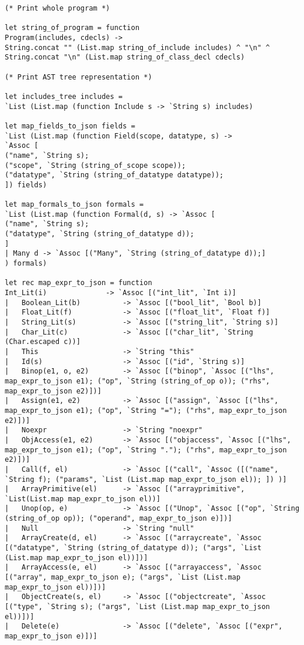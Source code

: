 \begin{verbatim}
(* Print whole program *)

let string_of_program = function
Program(includes, cdecls) -> 
String.concat "" (List.map string_of_include includes) ^ "\n" ^
String.concat "\n" (List.map string_of_class_decl cdecls)

(* Print AST tree representation *)

let includes_tree includes = 
`List (List.map (function Include s -> `String s) includes)

let map_fields_to_json fields = 
`List (List.map (function Field(scope, datatype, s) -> 
`Assoc [
("name", `String s);
("scope", `String (string_of_scope scope));
("datatype", `String (string_of_datatype datatype));
]) fields)

let map_formals_to_json formals = 
`List (List.map (function Formal(d, s) -> `Assoc [
("name", `String s);
("datatype", `String (string_of_datatype d));
]
| Many d -> `Assoc [("Many", `String (string_of_datatype d));]
) formals)

let rec map_expr_to_json = function 
Int_Lit(i)				-> `Assoc [("int_lit", `Int i)]
|	Boolean_Lit(b)			-> `Assoc [("bool_lit", `Bool b)]
|	Float_Lit(f)			-> `Assoc [("float_lit", `Float f)]
|	String_Lit(s)			-> `Assoc [("string_lit", `String s)]
|	Char_Lit(c)				-> `Assoc [("char_lit", `String (Char.escaped c))]
|	This					-> `String "this"
|	Id(s)					-> `Assoc [("id", `String s)]
|	Binop(e1, o, e2)		-> `Assoc [("binop", `Assoc [("lhs", map_expr_to_json e1); ("op", `String (string_of_op o)); ("rhs", map_expr_to_json e2)])]
|	Assign(e1, e2)			-> `Assoc [("assign", `Assoc [("lhs", map_expr_to_json e1); ("op", `String "="); ("rhs", map_expr_to_json e2)])]
|	Noexpr					-> `String "noexpr"
|	ObjAccess(e1, e2)		-> `Assoc [("objaccess", `Assoc [("lhs", map_expr_to_json e1); ("op", `String "."); ("rhs", map_expr_to_json e2)])]
|	Call(f, el)				-> `Assoc [("call", `Assoc ([("name", `String f); ("params", `List (List.map map_expr_to_json el)); ]) )]
|	ArrayPrimitive(el)		-> `Assoc [("arrayprimitive", `List(List.map map_expr_to_json el))]
|  	Unop(op, e)				-> `Assoc [("Unop", `Assoc [("op", `String (string_of_op op)); ("operand", map_expr_to_json e)])]
|	Null					-> `String "null"
|   ArrayCreate(d, el)  	-> `Assoc [("arraycreate", `Assoc [("datatype", `String (string_of_datatype d)); ("args", `List (List.map map_expr_to_json el))])]
|   ArrayAccess(e, el)  	-> `Assoc [("arrayaccess", `Assoc [("array", map_expr_to_json e); ("args", `List (List.map map_expr_to_json el))])]
|   ObjectCreate(s, el) 	-> `Assoc [("objectcreate", `Assoc [("type", `String s); ("args", `List (List.map map_expr_to_json el))])]
| 	Delete(e) 				-> `Assoc [("delete", `Assoc [("expr", map_expr_to_json e)])]


\end{verbatim}
